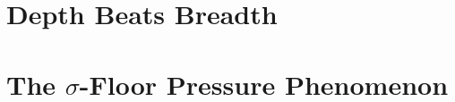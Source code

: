 \section{Depth Beats Breadth}
\label{sec:depth-vs-breadth}

%
%
%
%
%


\section{The $\sigma$-Floor Pressure Phenomenon}
\label{sec:sigma-floor}

